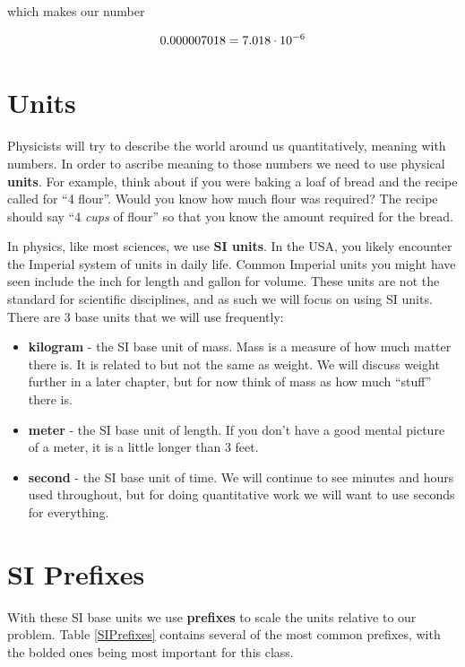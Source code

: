 \documentclass[12pt]{book}
\begin{document}
which makes our number

\begin{equation}
0.000007018 = 7.018 \cdot 10^{-6}
\end{equation}

\section{Units}

Physicists will try to describe the world around us quantitatively, meaning with numbers. In order to ascribe meaning to those numbers we need to use physical \textbf{units}. For example, think about if you were baking a loaf of bread and the recipe called for ``4 flour''. Would you know how much flour was required? The recipe should say ``4 \textit{cups} of flour'' so that you know the amount required for the bread. 

In physics, like most sciences, we use \textbf{SI units}. In the USA, you likely encounter the Imperial system of units in daily life. Common Imperial units you might have seen include the inch for length and gallon for volume. These units are not the standard for scientific disciplines, and as such we will focus on using SI units. There are 3 base units that we will use frequently:

\begin{itemize}
\item \textbf{kilogram} - the SI base unit of mass. Mass is a measure of how much matter there is. It is related to but not the same as weight. We will discuss weight further in a later chapter, but for now think of mass as how much ``stuff'' there is.

\item \textbf{meter} - the SI base unit of length. If you don't have a good mental picture of a meter, it is a little longer than 3 feet.

\item \textbf{second} - the SI base unit of time. We will continue to see minutes and hours used throughout, but for doing quantitative work we will want to use seconds for everything.
\end{itemize}

\section{SI Prefixes}

With these SI base units we use \textbf{prefixes} to scale the units relative to our problem. Table \ref{SIPrefixes} contains several of the most common prefixes, with the bolded ones being most important for this class.
\end{document}
